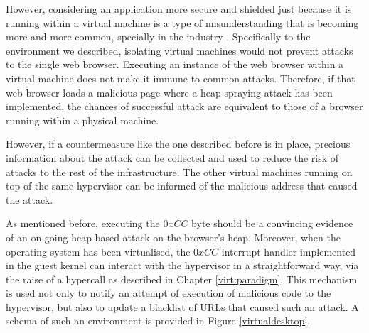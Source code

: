 However, considering an application more secure and shielded just because it is running within a virtual machine is a type of misunderstanding that is becoming more and more common, specially in the industry \cite{virtoverkill}. Specifically to the environment we described, isolating virtual machines would not prevent attacks to the single web browser. Executing an instance of the web browser within a virtual machine does not make it immune to common attacks. Therefore, if that web browser loads a malicious page where a heap-spraying attack has been implemented, the chances of successful attack are equivalent to those of a browser running within a physical machine. 

However, if a countermeasure like the one described before is in place, precious information about the attack can be collected and used to reduce the risk of attacks to the rest of the infrastructure. The other virtual machines running on top of the same hypervisor can be informed of the malicious address that caused the attack. 

As mentioned before, executing the $0xCC$ byte should be a convincing evidence of an on-going heap-based attack on the browser's heap. Moreover, when the operating system has been virtualised, the $0xCC$ interrupt handler implemented in the guest kernel can interact with the hypervisor in a straightforward way, via the raise of a hypercall as described in Chapter \ref{virt:paradigm}. This mechanism is used not only to notify  an attempt of execution of malicious code to the hypervisor, but also to update a blacklist of URLs that caused such an attack.
A schema of such an environment is provided in Figure \ref{virtualdesktop}.

